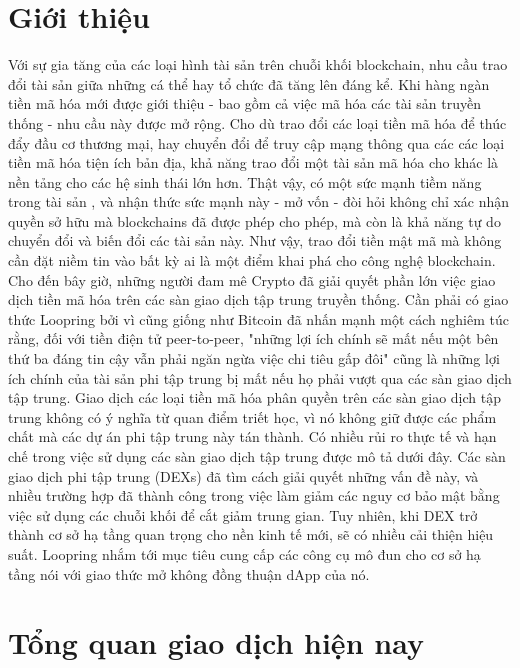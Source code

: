 \documentclass[12pt,a4paper]{article}
\begin{document}
\begin{multicols}{2}
\section{Giới thiệu\label{sec:introduction}}
Với sự gia tăng của các loại hình tài sản trên chuỗi khối blockchain, nhu cầu trao đổi tài sản giữa những cá thể hay tổ chức đã tăng lên đáng kể. Khi hàng ngàn tiền mã hóa mới được giới thiệu - bao gồm cả việc mã hóa các tài sản truyền thống - nhu cầu này được mở rộng. Cho dù trao đổi các loại tiền mã hóa để thúc đẩy đầu cơ thương mại, hay chuyển đổi để truy cập mạng thông qua các các loại tiền mã hóa tiện ích bản địa, khả năng trao đổi một tài sản mã hóa cho khác là nền tảng cho các hệ sinh thái lớn hơn. Thật vậy, có một sức mạnh tiềm năng trong tài sản \cite{limitorderliquidity}, và nhận thức sức mạnh này - mở vốn - đòi hỏi không chỉ xác nhận quyền sở hữu mà blockchains đã được phép cho phép, mà còn là khả năng tự do chuyển đổi và biến đổi các tài sản này.
Như vậy, trao đổi tiền mật mã mà không cần đặt niềm tin vào bất kỳ ai là một điểm khai phá cho công nghệ blockchain. Cho đến bây giờ, những người đam mê Crypto đã giải quyết phần lớn việc giao dịch tiền mã hóa trên các sàn giao dịch tập trung truyền thống. Cần phải có giao thức Loopring bởi vì cũng giống như Bitcoin \cite{costofdecent} đã nhấn mạnh một cách nghiêm túc rằng, đối với tiền điện tử peer-to-peer, "những lợi ích chính sẽ mất nếu một bên thứ ba đáng tin cậy vẫn phải ngăn ngừa việc chi tiêu gấp đôi" cũng là những lợi ích chính của tài sản phi tập trung bị mất nếu họ phải vượt qua các sàn giao dịch tập trung.
Giao dịch các loại tiền mã hóa phân quyền trên các sàn giao dịch tập trung không có ý nghĩa từ quan điểm triết học, vì nó không giữ được các phẩm chất mà các dự án phi tập trung này tán thành. Có nhiều rủi ro thực tế và hạn chế trong việc sử dụng các sàn giao dịch tập trung được mô tả dưới đây. Các sàn giao dịch phi tập trung (DEXs) \cite{supersymmetry} \cite{coinport2014udom} \cite{vitalikgovernance} đã tìm cách giải quyết những vấn đề này, và nhiều trường hợp đã thành công trong việc làm giảm các nguy cơ bảo mật bằng việc sử dụng các chuỗi khối để cắt giảm trung gian. Tuy nhiên, khi DEX trở thành cơ sở hạ tầng quan trọng cho nền kinh tế mới, sẽ có nhiều cải thiện hiệu suất. Loopring nhắm tới mục tiêu cung cấp các công cụ mô đun cho cơ sở hạ tầng nói với giao thức mở không đồng thuận dApp của nó.

\section{Tổng quan giao dịch hiện nay\label{sec:current_exchange_landscape}}


\end{multicols}
\end{document}
